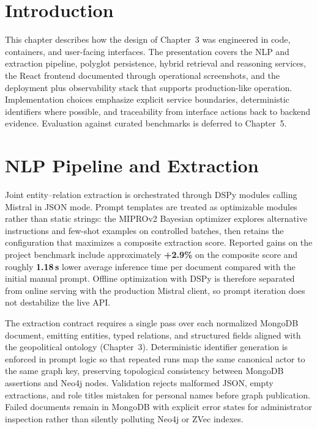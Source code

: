 

\section{Introduction}

This chapter describes how the design of Chapter~3 was engineered in code, containers, and user-facing interfaces. The presentation covers the NLP and extraction pipeline, polyglot persistence, hybrid retrieval and reasoning services, the React frontend documented through operational screenshots, and the deployment plus observability stack that supports production-like operation. Implementation choices emphasize explicit service boundaries, deterministic identifiers where possible, and traceability from interface actions back to backend evidence. Evaluation against curated benchmarks is deferred to Chapter~5.

\section{NLP Pipeline and Extraction}

Joint entity--relation extraction is orchestrated through DSPy modules calling Mistral in JSON mode. Prompt templates are treated as optimizable modules rather than static strings: the MIPROv2 Bayesian optimizer explores alternative instructions and few-shot examples on controlled batches, then retains the configuration that maximizes a composite extraction score. Reported gains on the project benchmark include approximately \textbf{+2.9\%} on the composite score and roughly \textbf{1.18\,s} lower average inference time per document compared with the initial manual prompt. Offline optimization with DSPy is therefore separated from online serving with the production Mistral client, so prompt iteration does not destabilize the live API.

The extraction contract requires a single pass over each normalized MongoDB document, emitting entities, typed relations, and structured fields aligned with the geopolitical ontology (Chapter~3). Deterministic identifier generation is enforced in prompt logic so that repeated runs map the same canonical actor to the same graph key, preserving topological consistency between MongoDB assertions and Neo4j nodes. Validation rejects malformed JSON, empty extractions, and role titles mistaken for personal names before graph publication. Failed documents remain in MongoDB with explicit error states for administrator inspection rather than silently polluting Neo4j or ZVec indexes.

